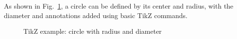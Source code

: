 \documentclass{article}
\begin{document}
\noindent As shown in Fig.~\ref{fig:circle}, a circle can be defined by its center and radius, with the diameter and annotations added using basic TikZ commands.
	
	\begin{figure}[ht]        %
		\centering            %
		
		\begin{tikzpicture}[scale=2]  %
			
			
				
		\end{tikzpicture}

		\caption{TikZ example: circle with radius and diameter}
		\label{fig:circle}
	\end{figure}
	
\end{document}
